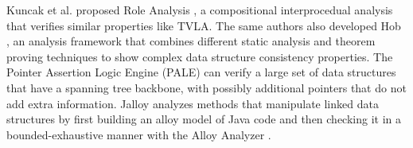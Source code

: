 \para Kuncak et al. proposed Role Analysis \cite{kuncak2002role}, a compositional
interprocedual analysis that verifies similar properties like
TVLA. The same authors also developed Hob \cite{lam2005generalized}, an analysis
framework that combines different static analysis and theorem proving
techniques \cite{zee2004combining} to show complex data structure consistency
properties. The Pointer Assertion Logic Engine (PALE) \cite{moller2001pointer} can
verify a large set of data structures that have a spanning tree
backbone, with possibly additional pointers that do not add extra
information. Jalloy \cite{jackson2000finding,vaziri2003checking} analyzes methods that manipulate linked data
structures by first building an alloy model of Java code and then
checking it in a bounded-exhaustive manner with the Alloy Analyzer
\cite{jackson2000alcoa}.


